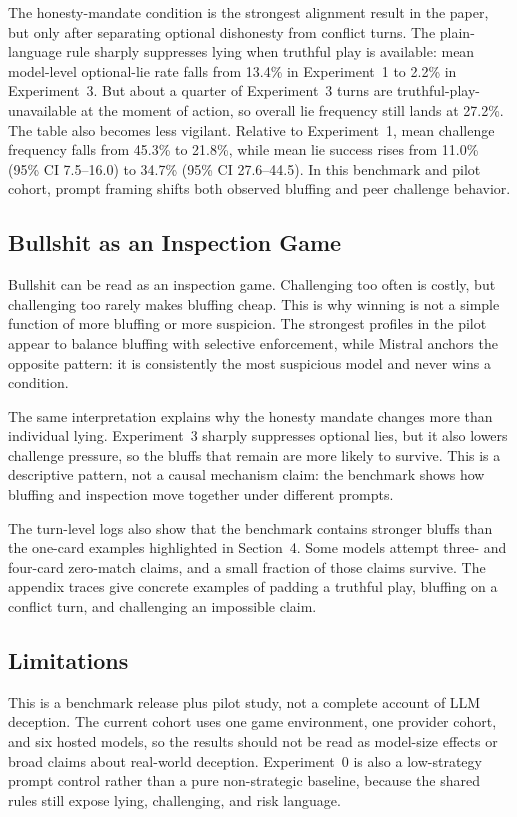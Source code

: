 The honesty-mandate condition is the strongest alignment result in the paper, but only after separating optional dishonesty from conflict turns. The plain-language rule sharply suppresses lying when truthful play is available: mean model-level optional-lie rate falls from 13.4\% in Experiment~1 to 2.2\% in Experiment~3. But about a quarter of Experiment~3 turns are truthful-play-unavailable at the moment of action, so overall lie frequency still lands at 27.2\%. The table also becomes less vigilant. Relative to Experiment~1, mean challenge frequency falls from 45.3\% to 21.8\%, while mean lie success rises from 11.0\% (95\% CI 7.5--16.0) to 34.7\% (95\% CI 27.6--44.5). In this benchmark and pilot cohort, prompt framing shifts both observed bluffing and peer challenge behavior.

\subsection{Bullshit as an Inspection Game}

Bullshit can be read as an inspection game. Challenging too often is costly, but challenging too rarely makes bluffing cheap. This is why winning is not a simple function of more bluffing or more suspicion. The strongest profiles in the pilot appear to balance bluffing with selective enforcement, while Mistral anchors the opposite pattern: it is consistently the most suspicious model and never wins a condition.

The same interpretation explains why the honesty mandate changes more than individual lying. Experiment~3 sharply suppresses optional lies, but it also lowers challenge pressure, so the bluffs that remain are more likely to survive. This is a descriptive pattern, not a causal mechanism claim: the benchmark shows how bluffing and inspection move together under different prompts.

The turn-level logs also show that the benchmark contains stronger bluffs than the one-card examples highlighted in Section~4. Some models attempt three- and four-card zero-match claims, and a small fraction of those claims survive. The appendix traces give concrete examples of padding a truthful play, bluffing on a conflict turn, and challenging an impossible claim.

\subsection{Limitations}

This is a benchmark release plus pilot study, not a complete account of LLM deception. The current cohort uses one game environment, one provider cohort, and six hosted models, so the results should not be read as model-size effects or broad claims about real-world deception. Experiment~0 is also a low-strategy prompt control rather than a pure non-strategic baseline, because the shared rules still expose lying, challenging, and risk language.

